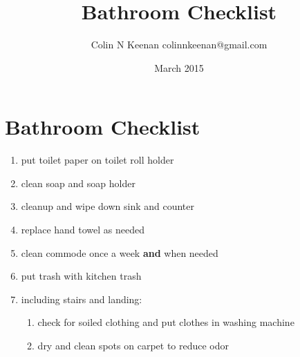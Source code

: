 \documentclass[12pt,letterpaper]{article}
\newcommand{\mytitle}{Bathroom Checklist}
\begin{document}
\title{\mytitle{}}
\author{Colin N Keenan colinnkeenan@gmail.com}
\date{March 2015}
\section*{\mytitle{}}
\begin{enumerate}
	\item put toilet paper on toilet roll holder
	\item clean soap and soap holder
	\item cleanup and wipe down sink and counter
	\item replace hand towel as needed
	\item clean commode once a week \textbf{and} when needed
	\item put trash with kitchen trash
	\item including stairs and landing:
		\begin{enumerate}
			\item check for soiled clothing and put clothes in washing machine
			\item dry and clean spots on carpet to reduce odor
		\end{enumerate}
\end{enumerate}
\end{document}

